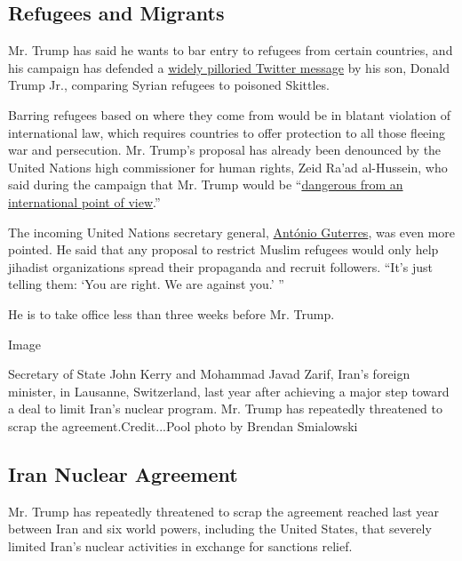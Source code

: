 \hypertarget{refugees-and-migrants}{%
\subsection{Refugees and Migrants}\label{refugees-and-migrants}}

Mr. Trump has said he wants to bar entry to refugees from certain
countries, and his campaign has defended a
\href{http://www.nytimes.com/2016/09/21/us/politics/donald-trump-jr-skittles.html}{widely
pilloried Twitter message} by his son, Donald Trump Jr., comparing
Syrian refugees to poisoned Skittles.

Barring refugees based on where they come from would be in blatant
violation of international law, which requires countries to offer
protection to all those fleeing war and persecution. Mr. Trump's
proposal has already been denounced by the United Nations high
commissioner for human rights, Zeid Ra'ad al-Hussein, who said during
the campaign that Mr. Trump would be
``\href{https://www.nytimes.com/2016/10/13/world/europe/donald\%2Dtrump\%2Dun\%2Dhuman\%2Drights.html}{dangerous
from an international point of view}.''

The incoming United Nations secretary general,
\href{http://www.nytimes.com/2016/10/07/world/americas/antonio-guterres-united-nations-secretary-general.html}{António
Guterres}, was even more pointed. He said that any proposal to restrict
Muslim refugees would only help jihadist organizations spread their
propaganda and recruit followers. ``It's just telling them: `You are
right. We are against you.' ''

He is to take office less than three weeks before Mr. Trump.

Image

Secretary of State John Kerry and Mohammad Javad Zarif, Iran's foreign
minister, in Lausanne, Switzerland, last year after achieving a major
step toward a deal to limit Iran's nuclear program. Mr. Trump has
repeatedly threatened to scrap the agreement.Credit...Pool photo by
Brendan Smialowski

\hypertarget{iran-nuclear-agreement}{%
\subsection{Iran Nuclear Agreement}\label{iran-nuclear-agreement}}

Mr. Trump has repeatedly threatened to scrap the agreement reached last
year between Iran and six world powers, including the United States,
that severely limited Iran's nuclear activities in exchange for
sanctions relief.

